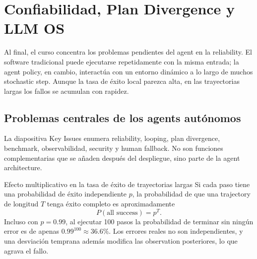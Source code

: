 \section{Confiabilidad, Plan Divergence y LLM OS}

Al final, el curso concentra los problemas pendientes del agent en la reliability. El software tradicional puede ejecutarse repetidamente con la misma entrada; la agent policy, en cambio, interactúa con un entorno dinámico a lo largo de muchos stochastic step. Aunque la tasa de éxito local parezca alta, en las trayectorias largas los fallos se acumulan con rapidez.

\subsection{Problemas centrales de los agents autónomos}

La diapositiva Key Issues enumera reliability, looping, plan divergence, benchmark, observabilidad, security y human fallback. No son funciones complementarias que se añaden después del despliegue, sino parte de la agent architecture.


\begin{importantbox}{Efecto multiplicativo en la tasa de éxito de trayectorias largas}
Si cada paso tiene una probabilidad de éxito independiente $p$, la probabilidad de que una trajectory de longitud $T$ tenga éxito completo es aproximadamente
\[
P(\text{all success})=p^T.
\]
Incluso con $p=0.99$, al ejecutar 100 pasos la probabilidad de terminar sin ningún error es de apenas $0.99^{100}\approx 36.6\%$. Los errores reales no son independientes, y una desviación temprana además modifica las observation posteriores, lo que agrava el fallo.
\end{importantbox}



